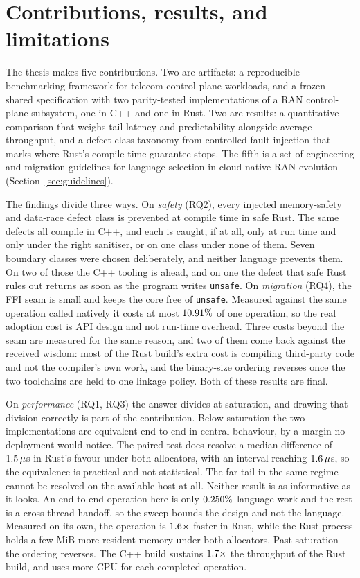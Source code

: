 \documentclass[english,oneside,a4paper,censored,csm,software-track-2020]{HYthesisML}
\begin{document}
\section{Contributions, results, and limitations}
The thesis makes five contributions. Two are artifacts: a reproducible benchmarking framework
for telecom control-plane workloads, and a frozen shared specification with two parity-tested
implementations of a RAN control-plane subsystem, one in C++ and one in Rust. Two are results:
a quantitative comparison that weighs tail latency and predictability alongside average
throughput, and a defect-class taxonomy from controlled fault injection that marks where Rust's
compile-time guarantee stops. The fifth is a set of engineering and migration guidelines for
language selection in cloud-native RAN evolution (Section~\ref{sec:guidelines}).

The findings divide three ways. On \emph{safety} (RQ2), every injected memory-safety and
data-race defect class is prevented at compile time in safe Rust. The same defects all compile
in C++, and each is caught, if at all, only at run time and only under the right sanitiser, or on
one class under none of them. Seven
boundary classes were chosen deliberately, and neither language prevents them. On two of those
the C++ tooling is ahead, and on one the defect that safe Rust rules out returns as soon as the
program writes \texttt{unsafe}. On \emph{migration} (RQ4), the FFI seam is small and keeps the core
free of \texttt{unsafe}. Measured against the same operation called natively it costs at most
$10.91\%$ of one operation, so the real adoption cost is API design and not run-time
overhead. Three costs beyond the seam are measured for the same reason, and two of them come back
against the received wisdom: most of the Rust build's extra cost is compiling third-party code and
not the compiler's own work, and the binary-size ordering reverses once the two toolchains are held
to one linkage policy. Both of these results are final.

On \emph{performance} (RQ1, RQ3) the answer divides at saturation, and drawing that division
correctly is part of the contribution. Below saturation the two implementations are equivalent end
to end in central behaviour, by a margin no deployment would notice. The paired test does resolve a
median difference of $1.5\,\mu$s in Rust's favour under both allocators, with an
interval reaching $1.6\,\mu$s, so the equivalence is practical and not statistical.
The far tail in the same regime cannot be resolved on the available host at all. Neither result is
as informative as it looks. An end-to-end operation here is only
$0.250\%$ language work and the rest is a cross-thread handoff, so the sweep bounds
the design and not the language. Measured on its own, the operation is
$1.6\times$ faster in Rust, while the Rust process holds a few MiB more resident
memory under both allocators. Past saturation the ordering reverses. The C++ build sustains
$1.7\times$ the throughput of the Rust build, and uses more CPU for each completed
operation.
\end{document}

